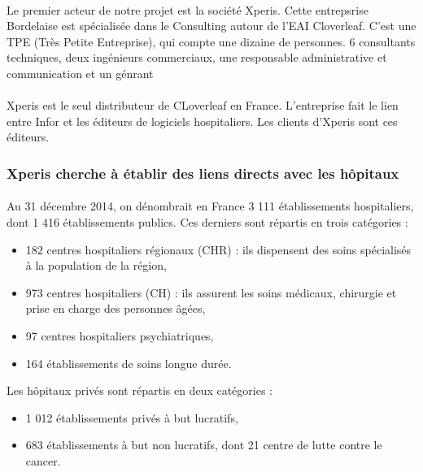 			\paragraph{}%
			Le premier acteur de notre projet est la société Xperis. Cette entrepsrise
			Bordelaise est spécialisée dans le Consulting autour de l'EAI Cloverleaf.
			C'est une TPE (Très Petite Entreprise), qui compte une dizaine de personnes.
			6 consultants techniques, deux ingénieurs commerciaux, une responsable
			administrative et communication et un génrant
			
			\paragraph{}%
			Xperis est le seul distributeur de CLoverleaf en France. L'entreprise fait le
			lien entre Infor et les éditeurs de logiciels hospitaliers. Les clients
			d'Xperis sont ces éditeurs.
			
		\subsubsection{Xperis cherche à établir des liens directs avec les hôpitaux}
			\paragraph{}%
			Au 31 décembre 2014, on dénombrait en France 3 111 établissements hospitaliers, 
			dont 1 416 établissements publics. Ces derniers sont répartis en trois catégories 
			\citep{drees_panoramas_2016} :
			\begin{itemize}
				\item 182 centres hospitaliers régionaux (CHR) : ils dispensent des soins 
				spécialisés à la population de la région,
				\item 973 centres hospitaliers (CH) : ils assurent les soins médicaux, 
				chirurgie et prise en charge des personnes âgées,
				\item 97 centres hospitaliers psychiatriques,
				\item 164 établissements de soins longue durée.
			\end{itemize}
			Les hôpitaux privés sont répartis en deux catégories :
			\begin{itemize}
				\item 1 012 établissements privés à but lucratifs,
				\item 683 établissements à but non lucratifs, dont 21 centre de lutte contre 
				le cancer.
			\end{itemize}
			
